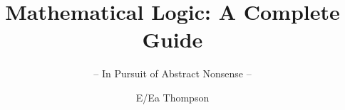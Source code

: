\documentclass[graybox,envcountchap,sectrefs]{style/svmono}
\begin{document}
\author{E/Ea Thompson}
\title{Mathematical Logic: A Complete Guide}
\subtitle{-- In Pursuit of Abstract Nonsense --}
\maketitle

\frontmatter%

%
%

%

\tableofcontents

%


\mainmatter%























































\backmatter%
%
%
%
\printindex

\end{document}
